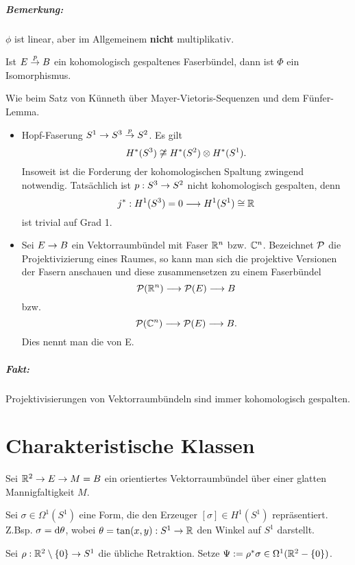 \paragraph{Bemerkung:}
$\phi$ ist linear, aber im Allgemeinem \textbf{nicht} multiplikativ.

\Satz{}
Ist $E \pfeil{p} B$ ein kohomologisch gespaltenes Faserbündel, dann ist $\Phi$ ein Isomorphismus.
\begin{Beweis}{}
Wie beim Satz von Künneth über Mayer-Vietoris-Sequenzen und dem Fünfer-Lemma.
\end{Beweis}


\Bsp{}
\begin{itemize}
	\item Hopf-Faserung $S^1 \pfeil{} S^3 \pfeil{p} S^2$. Es gilt
	\[ H^*(S^3) \not\isom{} H^*(S^2) \otimes H^*(S^1). \]
	Insoweit ist die Forderung der kohomologischen Spaltung zwingend notwendig. Tatsächlich ist $p : S^3 \pfeil{} S^2$ nicht kohomologisch gespalten, denn
	\[ j^* : H^1(S^3) = 0 \Pfeil{} H^1(S^1) \isom{} \R \]
	ist trivial auf Grad 1.
	\item Sei $E \pfeil{} B$ ein Vektorraumbündel mit Faser $\R^n$ bzw. $\C^n$. Bezeichnet $\P$ die Projektivizierung eines Raumes, so kann man sich die projektive Versionen der Fasern anschauen und diese zusammensetzen zu einem Faserbündel
	\[ \P (\R^n) \Pfeil{} \P(E) \Pfeil{} B \]
	bzw.
	\[ \P (\C^n) \Pfeil{} \P(E) \Pfeil{} B. \]
	Dies nennt man die  von E.
\end{itemize}

\paragraph{Fakt:}
Projektivisierungen von Vektorraumbündeln sind immer kohomologisch gespalten.

\chapter{Charakteristische Klassen}
Sei $\R^2 \pfeil{} E \pfeil{} M = B$ ein orientiertes Vektorraumbündel über einer glatten Mannigfaltigkeit $M$.

Sei $\sigma \in \Omega^1(S^1)$ eine Form, die den Erzeuger $[\sigma] \in H^1(S^1)$ repräsentiert. Z.Bsp. $\sigma = \d \theta$, wobei $\theta = \tan(x,y) : S^1 \pfeil{} \R$ den Winkel auf $S^1$ darstellt.

Sei $\rho : \R^2 \setminus \{0\} \pfeil{} S^1$ die übliche Retraktion. Setze $\Psi := \rho^*\sigma \in \Omega^1(\R^2 - \{0\})$.

